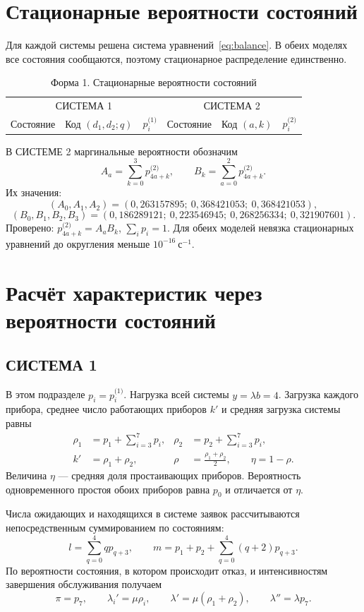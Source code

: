 \documentclass[11pt,a4paper]{article}
\newcommand{\sI}{\text{(1)}}
\newcommand{\sII}{\text{(2)}}
\newcommand{\secs}{\text{с}}
\begin{document}
\section{Стационарные вероятности состояний}
Для каждой системы решена система уравнений~\eqref{eq:balance}. В обеих моделях все состояния сообщаются, поэтому стационарное распределение единственно.

\begin{table}[H]\centering
\caption{Форма 1. Стационарные вероятности состояний}
\small
\begin{tabular}{ccrccr}
\toprule
\multicolumn{3}{c}{СИСТЕМА 1}&\multicolumn{3}{c}{СИСТЕМА 2}\\
Состояние&Код $(d_1,d_2;q)$&$p_i^{\sI}$&Состояние&Код $(a,k)$&$p_i^{\sII}$\\\midrule

\end{tabular}
\end{table}

В СИСТЕМЕ 2 маргинальные вероятности обозначим
\[
A_a=\sum_{k=0}^{3}p_{4a+k}^{\sII},\qquad B_k=\sum_{a=0}^{2}p_{4a+k}^{\sII}.
\]
Их значения:
\[
(A_0,A_1,A_2)=(0{,}263157895;\ 0{,}368421053;\ 0{,}368421053),
\]
\[
(B_0,B_1,B_2,B_3)=(0{,}186289121;\ 0{,}223546945;\ 0{,}268256334;\ 0{,}321907601).
\]
Проверено: $p_{4a+k}^{\sII}=A_aB_k$, $\sum_i p_i=1$. Для обеих моделей невязка стационарных уравнений до округления меньше $10^{-16}\ \secs^{-1}$.

\newpage
\section{Расчёт характеристик через вероятности состояний}
\subsection{СИСТЕМА 1}
В этом подразделе $p_i=p_i^{\sI}$. Нагрузка всей системы $y=\lambda b=4$. Загрузка каждого прибора, среднее число работающих приборов $k'$ и средняя загрузка системы равны
\begin{align}
\rho_1&=p_1+\sum_{i=3}^{7}p_i,&
\rho_2&=p_2+\sum_{i=3}^{7}p_i,\\
k'&=\rho_1+\rho_2,& \rho&=\frac{\rho_1+\rho_2}{2},\qquad \eta=1-\rho.
\end{align}
Величина $\eta$ --- средняя доля простаивающих приборов. Вероятность одновременного простоя обоих приборов равна $p_0$ и отличается от $\eta$.

Числа ожидающих и находящихся в системе заявок рассчитываются непосредственным суммированием по состояниям:
\begin{equation}
l=\sum_{q=0}^{4}q p_{q+3},\qquad
m=p_1+p_2+\sum_{q=0}^{4}(q+2)p_{q+3}.
\end{equation}
По вероятности состояния, в котором происходит отказ, и интенсивностям завершения обслуживания получаем
\begin{equation}
\pi=p_7,\qquad \lambda_i'=\mu\rho_i,\qquad
\lambda'=\mu(\rho_1+\rho_2),\qquad \lambda''=\lambda p_7.
\end{equation}
\end{document}
